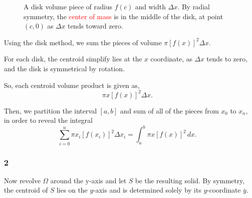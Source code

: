\documentclass[../hw7.tex]{subfiles}
\begin{document}
\begin{figure*}[ht]
\centering
{}
\caption{A disk volume piece of radius $f(c)$ and width $\Delta x$. By radial symmetry, the \textcolor{red}{center of mass} is in the middle of the disk, at point $(c,0)$ as $\Delta x$ tends toward zero.}
\end{figure*}

Using the disk method, we sum the pieces of volume $\pi {[f(x)]}^2 \Delta x$.

For each disk, the centroid simplify lies at the $x$ coordinate, as $\Delta x$ tends to zero, and the disk is symmetrical by rotation.

So, each centroid volume product is given as, \[\pi x {[f(x)]}^2 \Delta x.\]

Then, we partition the interval $[a,b]$ and sum of all of the pieces from $x_0$ to $x_n$, in order to reveal the integral
\[\sum\limits_{i=0}^{n} \pi x_i {[f(x_i)]}^2 \Delta x_i = \int_{a}^{b} \pi x {[f(x)]}^2\,dx.\]

\subsubsection*{2}
Now revolve $\Omega$ around the y-axis and let $S$ be the resulting solid. By symmetry, the centroid of $S$ lies on the $y$-axis and is determined solely by its $y$-coordinate $\overline{y}$.
\end{document}

